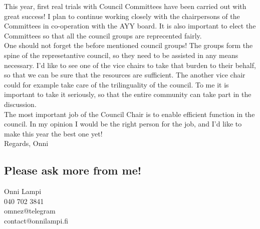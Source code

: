 \documentclass[a4paper, 12pt, finnish]{report}
\begin{document}
This year, first real trials with Council Committees have been carried out with great success!
I plan to continue working closely with the chairpersons of the Committees in co-operation with the AYY board.
It is also important to elect the Committees so that all the council groups are reprecented fairly.\\

One should not forget the before mentioned council groups!
The groups form the spine of the represetantive council, so they need to be assisted in any means necessary.
I'd like to see one of the vice chairs to take that burden to their behalf, so that we can be sure that the resources are sufficient.
The another vice chair could for example take care of the trilinguality of the council.
To me it is important to take it seriously, so that the entire community can take part in the discussion.\\

The most important job of the Council Chair is to enable efficient function in the council.
In my opinion I would be the right person for the job, and I'd like to make this year the best one yet!\\

Regards, Onni


\subsection*{Please ask more from me!}
Onni Lampi\\
040 702 3841\\
omnez@telegram\\
contact@onnilampi.fi
\end{document}
